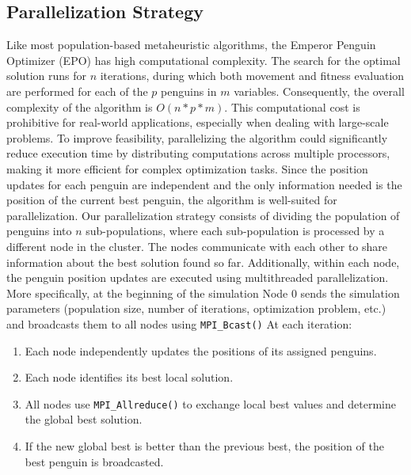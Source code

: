 \subsection{Parallelization Strategy}
Like most population-based metaheuristic algorithms, the Emperor Penguin Optimizer (EPO) has
high computational complexity. The search for the optimal solution runs for \( n \) iterations, during which both movement and fitness evaluation are performed for each of the \( p \) penguins in \(m\) variables. Consequently, the overall complexity of the algorithm is \( O(n*p*m) \).
This computational cost is prohibitive for real-world applications, especially when dealing with large-scale problems. To improve feasibility, parallelizing the algorithm could significantly reduce execution time by distributing computations across multiple processors, making it more efficient for complex optimization tasks.
Since the position updates for each penguin are independent and the only information needed is the position of the current best penguin, the algorithm is well-suited for parallelization.
\newline
Our parallelization strategy consists of dividing the population of penguins into $n$ sub-populations, where each sub-population is processed by a different node in the cluster. 
The nodes communicate with each other to share information about the best solution found so far.
Additionally, within each node, the penguin position updates are executed using multithreaded parallelization.
More specifically, at the beginning of the simulation Node 0 sends the simulation parameters (population size, number of iterations, optimization problem, etc.) and broadcasts them to all nodes using \texttt{MPI\_Bcast()}
\newline
At each iteration:
\begin{enumerate}
    \item Each node independently updates the positions of its assigned penguins.
    \item Each node identifies its best local solution.
    \item All nodes use \texttt{MPI\_Allreduce()} to exchange local best values and determine the global best solution.
    \item If the new global best is better than the previous best, the position of the best penguin is broadcasted.
\end{enumerate}

